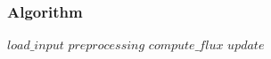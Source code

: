 \begin{frame}[plain]
\begin{figure}
\begin{columns}
			\vfill
			\vfill
		\end{columns}
	\end{figure}
\end{frame}

\begin{frame}
	\frametitle{Algorithm}

	\begin{algorithmic}
		\State $load\_input$
		\State $preprocessing$
			\State $compute\_flux$
			\State $update$
		\EndWhile
	\end{algorithmic}
\end{frame}
